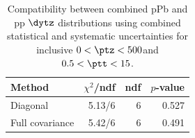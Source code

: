\begin{table}[htp!]
\centering
\begin{tabular}{|l|r|r|r|}
\hline
Method & $\chi^2$/ndf & ndf & $p$-value \\
\hline
Diagonal & 5.13/6 & 6 & 0.527 \\
Full covariance & 5.42/6 & 6 & 0.491 \\
\hline
\end{tabular}
\caption{Compatibility between combined pPb and pp $\dytz$ distributions using combined statistical and systematic uncertainties for inclusive $0 < \ptz < 500$\GeV and $0.5 < \ptt < 15$\GeV.}
\label{table:chisq_deta}
\end{table}
